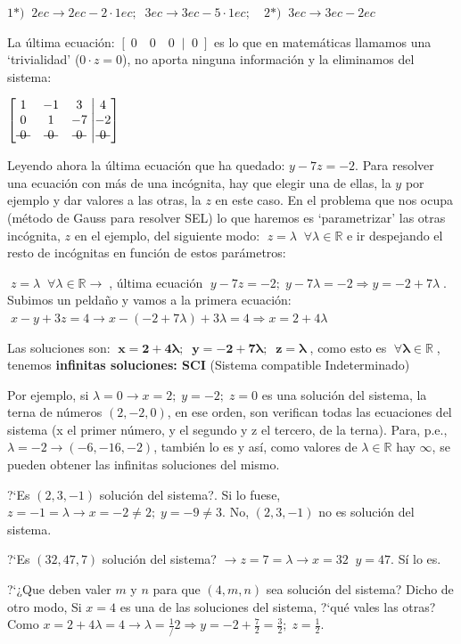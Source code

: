 \begin{ejem}
  \textcolor{gris}{$1*)\;\; 2ec \to 2ec  -  2\cdot 1ec; \; \; 3ec\to 3ec - 5\cdot 1ec; \quad 2*)\; \; 3ec \to 3ec  -  2ec $}


La última ecuación: $[\; 0\quad 0\quad 0 \; \; |\;\;  0\;]$ es lo que en matemáticas llamamos una `trivialidad' ($0\cdot z=0$), no aporta ninguna información y la eliminamos del sistema:

$  \left[ \begin{matrix}
 1&-1&3\\0&1&-7\\ \text{\textst{ 0 }} & \text{\textst{ 0 }} & \text{\textst{ 0 }}
 \end{matrix}\right. 
 \left| \begin{matrix}
 4\\-2\\ \text{\textst{ 0 }}	
 \end{matrix}\right] $


Leyendo ahora la última ecuación que ha quedado: $y-7z=-2$. Para resolver una ecuación con más de una incógnita, hay que elegir una de ellas, la $y$ por ejemplo y dar valores a las otras, la $z$ en este caso. En el problema que nos ocupa (método de Gauss para resolver SEL) lo que haremos es `parametrizar' las otras incógnita, $z$ en el ejemplo, del siguiente modo: $\;z=\lambda\; \; \forall \lambda \in \mathbb R$ e ir despejando el resto de incógnitas en función de estos parámetros:



$\;z=\lambda\; \; \forall \lambda \in \mathbb R \to \; $, última ecuación $\; y-7z=-2; \; y-7\lambda=-2 \Rightarrow y=-2+7\lambda\; $. Subimos un peldaño y vamos a la primera ecuación: $\; x-y+3z=4 \to x-(-2+7\lambda)+3\lambda=4 \Rightarrow x=2+4\lambda$



Las soluciones son: $\boldsymbol{\; x=2+4\lambda; \; \; y=-2+7\lambda; \; \; z=\lambda \;} $, como esto es  $\boldsymbol{\; \forall \lambda \in \mathbb R\;}$, tenemos \textbf{infinitas soluciones: SCI} (Sistema compatible Indeterminado)

Por ejemplo, si $\lambda=0 \to x=2; \; y=-2; \; z=0$ es una solución del sistema, la terna de números $(2,-2,0)$, en ese orden, son verifican todas las ecuaciones del sistema (x el primer número, y el segundo y z el tercero, de la terna). Para, p.e., $\lambda=-2 \to (-6,-16,-2)$, también lo es y así, como valores de $\lambda \in \mathbb R$ hay $\infty$, se pueden obtener las infinitas soluciones del mismo.

?`Es $(2,3,-1)$ solución del sistema?. Si lo fuese, $z=-1=\lambda \to x=-2\neq 2; \; y=-9\neq 3$. No, $(2,3,-1)$  no es solución del sistema.

?`Es $(32, 47, 7) $ solución del sistema? $\to z=7=\lambda \to x=32\; \; y=47$. Sí lo es.

?`¿Que deben valer $m$ y $n$ para que $(4,m,n)$ sea solución del sistema? Dicho de otro modo, Si $x=4$ es una de las soluciones del sistema, ?`qué vales las otras? Como $x=2+4\lambda=4 \to \lambda = \frac 1 /2 \Rightarrow y=-2+\frac 7 2=\frac 3 2; \; z=\frac 1 2$.
\end{ejem}

